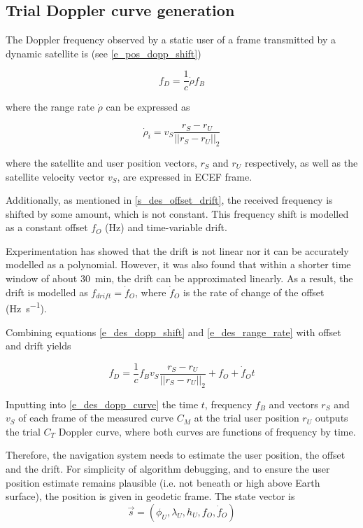 \subsection{Trial Doppler curve generation}
The Doppler frequency observed by a static user of a frame transmitted by a dynamic satellite  is (see \autoref{e_pos_dopp_shift})

\begin{equation}
    \label{e_des_dopp_shift}
    f_D = \frac{1}{c}\dot\rho f_B
\end{equation}

where the range rate $\dot\rho$ can be expressed as

\begin{equation}
    \label{e_des_range_rate}
    \dot\rho_i = v_S \frac{r_S - r_U}{||r_S - r_U||_2}
\end{equation}

where the satellite and user position vectors, $r_S$ and $r_U$ respectively, as well as the satellite velocity vector $v_S$, are expressed in ECEF frame.

Additionally, as mentioned in \autoref{s_des_offset_drift}, the received frequency is shifted by some amount, which is not constant. This frequency shift is modelled as a constant offset $f_O$ (Hz) and time-variable drift.

Experimentation has showed that the drift is not linear nor it can be accurately modelled as a polynomial. However, it was also found that within a shorter time window of about \qty{30}{min}, the drift can be approximated linearly. As a result, the drift is modelled as $f_{drift} = \dot f_O$, where $\dot f_O$ is the rate of change of the offset (\unit{\hertz\per\s}).

Combining equations \ref{e_des_dopp_shift} and \ref{e_des_range_rate} with offset and drift yields


\begin{equation}
    \label{e_des_dopp_curve}
    f_D = \frac{1}{c} f_B v_S \frac{r_S - r_U}{||r_S - r_U||_2} + f_O + \dot f_O t
\end{equation}

Inputting into \autoref{e_des_dopp_curve} the time $t$, frequency $f_B$ and vectors $r_S$ and $v_S$ of each frame of the measured curve $C_M$ at the trial user position $r_U$ outputs the trial $C_T$ Doppler curve, where both curves are functions of frequency by time.  %

Therefore, the navigation system needs to estimate the user position, the offset and the drift. For simplicity of algorithm debugging, and to ensure the user position estimate remains plausible (i.e. not beneath or high above Earth surface), the position is given in geodetic frame. The state vector is
\begin{equation*}
    \Vec{s} = (\phi_U, \lambda_U, h_U, f_O, \dot f_O)
\end{equation*}

